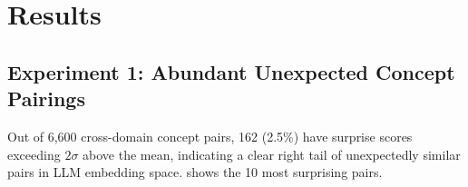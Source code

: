 \section{Results}
\label{sec:results}

\subsection{Experiment 1: Abundant Unexpected Concept Pairings}
\label{sec:results_exp1}

Out of 6,600 cross-domain concept pairs, 162 (2.5\%) have surprise scores exceeding $2\sigma$ above the mean, indicating a clear right tail of unexpectedly similar pairs in LLM embedding space.
 shows the 10 most surprising pairs.

\begin{table}[t]
    \centering
    \caption{Top 10 most surprising cross-domain concept pairs, ranked by \surprisescore (model similarity minus human similarity). Model similarity is cosine similarity of \embmodel embeddings; human similarity is Wu-Palmer WordNet score. Higher surprise indicates greater discrepancy between model and human judgments.}
    \label{tab:top_pairs}
\end{table}

